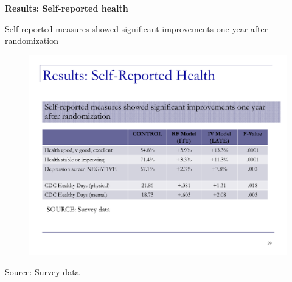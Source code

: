 \documentclass[notes=show]{beamer}
\begin{document}
\begin{frame}[plain]
	\begin{center}
	\textbf{Results: Self-reported health}
	\end{center}

Self-reported measures showed significant improvements one year after randomization
		
	\begin{figure}
	\includegraphics[scale=0.40]{./lecture_includes/baicker_10.pdf}
	\end{figure}
	
	Source: Survey data
	
\end{frame}
\end{document}
